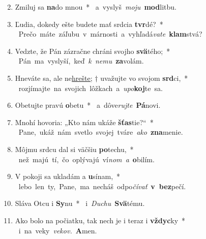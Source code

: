 \begin{flushleft}
\begin{enumerate}[leftmargin=*]
\setcounter{enumi}{1}
\item Zmiluj sa \textbf{na}do mnou~* \mbox{ a vyslyš {\it moju} \textbf{mod}litbu.}
\item Ľudia, dokedy ešte budete mať srdcia \textbf{tvr}dé?~* \mbox{ Prečo máte záľubu v márnosti a vyhľadá{\it vate} \textbf{klam}stvá?}
\item Vedzte, že Pán zázračne chráni svojho \textbf{svä}tého;~* \mbox{ Pán ma vyslyší, keď {\it k nemu} \textbf{za}volám.}
\item Hneváte sa, ale ne\underline{hrešte;} † uvažujte vo svojom \textbf{srd}ci,~* \mbox{ rozjímajte na svojich lôžkach a {\it upo}\textbf{koj}te sa.}
\item Obetujte pravú \textbf{o}betu~* \mbox{ a dôve{\it rujte} \textbf{Pá}novi.}
\item Mnohí hovoria: „Kto nám ukáže \textbf{šťas}tie?“~* \mbox{ Pane, ukáž nám svetlo svojej tváre {\it ako} \textbf{zna}menie.}
\item Môjmu srdcu dal si väčšiu \textbf{po}techu,~* \mbox{ než majú tí, čo oplývajú ví{\it nom a} \textbf{o}bilím.}
\item V pokoji sa ukladám a \textbf{u}sínam,~* \mbox{ lebo len ty, Pane, ma necháš odpo{\it čívať} \textbf{v bez}pečí.}
\item Sláva Otcu i \textbf{Sy}nu~* \mbox{ i {\it Duchu} \textbf{Svä}tému.}
\item Ako bolo na počiatku, tak nech je i teraz i \textbf{vždyc}ky~* \mbox{ i na veky {\it vekov.} \textbf{A}men.}\end{enumerate}
\end{flushleft}


